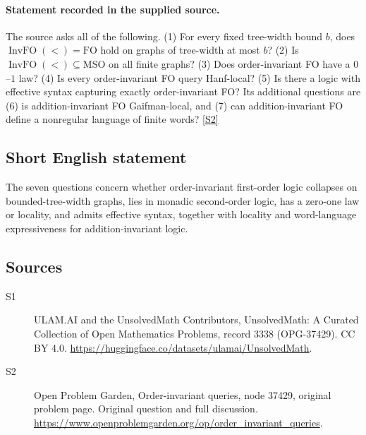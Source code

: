 \documentclass[11pt]{article}
\newcommand{\sref}[2]{\hyperlink{source:#1:#2}{[S#2]}}
\begin{document}
\paragraph{Statement recorded in the supplied source.}
The source asks all of the following. (1) For every fixed tree-width bound $b$, does $\operatorname{InvFO}(<)=\mathrm{FO}$ hold on graphs of tree-width at most $b$? (2) Is $\operatorname{InvFO}(<)\subseteq\mathrm{MSO}$ on all finite graphs? (3) Does order-invariant FO have a $0$--$1$ law? (4) Is every order-invariant FO query Hanf-local? (5) Is there a logic with effective syntax capturing exactly order-invariant FO? Its additional questions are (6) is addition-invariant FO Gaifman-local, and (7) can addition-invariant FO define a nonregular language of finite words? \sref{3338}{2}
\subsection{Short English statement}
The seven questions concern whether order-invariant first-order logic collapses on bounded-tree-width graphs, lies in monadic second-order logic, has a zero-one law or locality, and admits effective syntax, together with locality and word-language expressiveness for addition-invariant logic.
\subsection{Sources}
\begin{description}
\item[\hypertarget{source:3338:1}{S1}] ULAM.AI and the UnsolvedMath Contributors, UnsolvedMath: A Curated Collection of Open Mathematics Problems, record 3338 (OPG-37429). CC BY 4.0. \url{https://huggingface.co/datasets/ulamai/UnsolvedMath}.
\item[\hypertarget{source:3338:2}{S2}] Open Problem Garden, Order-invariant queries, node 37429, original problem page. Original question and full discussion. \url{https://www.openproblemgarden.org/op/order_invariant_queries}.

\end{description}
\label{end:3338}
\end{document}
